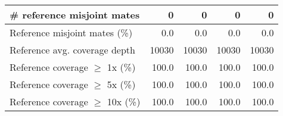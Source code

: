 \documentclass[12pt,a4paper]{article}
\begin{document}
\begin{table}[ht]
\begin{center}
\begin{tabular}{|l*{4}{|r}|}
\# reference misjoint mates & 0 & 0 & 0 & 0 \\ \hline
Reference misjoint mates (\%) & 0.0 & 0.0 & 0.0 & 0.0 \\ \hline
Reference avg. coverage depth & 10030 & 10030 & 10030 & 10030 \\ \hline
Reference coverage $\geq$ 1x (\%) & 100.0 & 100.0 & 100.0 & 100.0 \\ \hline
Reference coverage $\geq$ 5x (\%) & 100.0 & 100.0 & 100.0 & 100.0 \\ \hline
Reference coverage $\geq$ 10x (\%) & 100.0 & 100.0 & 100.0 & 100.0 \\ \hline
\end{tabular}
\end{center}
\end{table}
\end{document}
